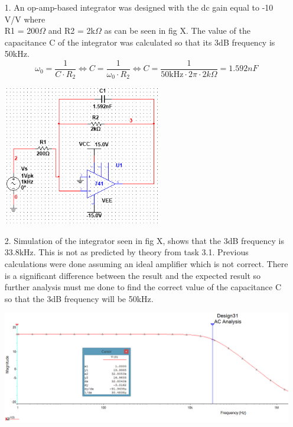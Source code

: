 \documentclass[11pt,a4paper]{article}
\begin{document}
\begin{enumerate}
  \item[1.]
  An op-amp-based integrator was designed with the dc gain equal to -10 V/V where \\R1 = 200$\Omega$ and R2 = 2k$\Omega$ as can be seen in fig X. The value of the capacitance C of the integrator was calculated so that its 3dB frequency is 50kHz. %
$$\omega_0 = \frac{1}{C\cdot R_2} \Leftrightarrow C = \frac{1}{\omega_0 \cdot R_2} \Leftrightarrow C  = \frac{1}{50\text{kHz}\cdot 2\pi \cdot 2k\Omega} = 1.592 nF $$
  \begin{minipage}{\linewidth}
    	\centering       
        \includegraphics[width=7cm]{Task3_1.png}
    \end{minipage}
  \item[2.]
  Simulation of the integrator seen in fig X, shows that the 3dB frequency is 33.8kHz. This is not as predicted by theory from task 3.1. Previous calculations were done assuming an ideal amplifier which is not correct. There is a significant difference between the result and the expected result so further analysis must me done to find the correct value of the capacitance C so that the 3dB frequency will be 50kHz.\\
  \begin{minipage}{\linewidth}
    	\centering       
        \includegraphics[width=14cm]{Task3_2.png}

\end{minipage}
\end{enumerate}
\end{document}
